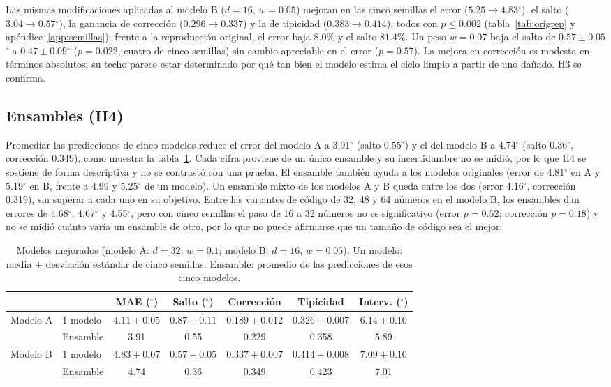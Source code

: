 \documentclass[11pt,a4paper]{amsart}
\newcommand{\gr}{$^{\circ}$}
\begin{document}
Las mismas modificaciones aplicadas al modelo B ($d=16$, $w=0.05$) mejoran en las cinco semillas el error ($5.25\to4.83$\gr), el salto ($3.04\to0.57$\gr), la ganancia de corrección ($0.296\to0.337$) y la de tipicidad ($0.383\to0.414$), todos con $p\le0.002$ (tabla~\ref{tab:origrep} y apéndice~\ref{app:semillas}); frente a la reproducción original, el error baja $8.0\%$ y el salto $81.4\%$. Un peso $w=0.07$ baja el salto de $0.57\pm0.05$\gr{} a $0.47\pm0.09$\gr{} ($p=0.022$, cuatro de cinco semillas) sin cambio apreciable en el error ($p=0.57$). La mejora en corrección es modesta en términos absolutos; su techo parece estar determinado por qué tan bien el modelo estima el ciclo limpio a partir de uno dañado. H3 se confirma.

\subsection{Ensambles (H4)}

Promediar las predicciones de cinco modelos reduce el error del modelo A a 3.91\gr{} (salto 0.55\gr{}) y el del modelo B a 4.74\gr{} (salto 0.36\gr{}, corrección 0.349), como muestra la tabla~\ref{tab:mejorados}. Cada cifra proviene de un único ensamble y su incertidumbre no se midió, por lo que H4 se sostiene de forma descriptiva y no se contrastó con una prueba. El ensamble también ayuda a los modelos originales (error de 4.81\gr{} en A y 5.19\gr{} en B, frente a $4.99$ y $5.25$\gr{} de un modelo). Un ensamble mixto de los modelos A y B queda entre los dos (error 4.16\gr{}, corrección 0.319), sin superar a cada uno en su objetivo. Entre las variantes de código de 32, 48 y 64 números en el modelo B, los ensambles dan errores de 4.68\gr{}, 4.67\gr{} y 4.55\gr{}, pero con cinco semillas el paso de 16 a 32 números no es significativo (error $p=0.52$; corrección $p=0.18$) y no se midió cuánto varía un ensamble de otro, por lo que no puede afirmarse que un tamaño de código sea el mejor.

\begin{table}[h]
\centering\small
\setlength{\tabcolsep}{3pt}
\begin{tabular}{llccccc}
\toprule
 & & MAE (\gr) & Salto (\gr) & Corrección & Tipicidad & Interv. (\gr) \\
\midrule
\multirow{2}{*}{Modelo A} & 1 modelo & $4.11\pm0.05$ & $0.87\pm0.11$ & $0.189\pm0.012$ & $0.326\pm0.007$ & $6.14\pm0.10$ \\
 & Ensamble & 3.91 & 0.55 & 0.229 & 0.358 & 5.89 \\
\midrule
\multirow{2}{*}{Modelo B} & 1 modelo & $4.83\pm0.07$ & $0.57\pm0.05$ & $0.337\pm0.007$ & $0.414\pm0.008$ & $7.09\pm0.10$ \\
 & Ensamble & 4.74 & 0.36 & 0.349 & 0.423 & 7.01 \\
\bottomrule
\end{tabular}
\caption{Modelos mejorados (modelo A: $d=32$, $w=0.1$; modelo B: $d=16$, $w=0.05$). Un modelo: media $\pm$ desviación estándar de cinco semillas. Ensamble: promedio de las predicciones de esos cinco modelos.}
\label{tab:mejorados}
\end{table}
\end{document}
